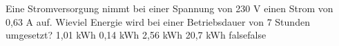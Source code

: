     {Eine Stromversorgung nimmt bei einer Spannung von 230 V einen Strom von 0,63 A auf. Wieviel Energie wird bei einer Betriebsdauer von 7 Stunden umgesetzt?}
    {1,01 kWh}
    {0,14 kWh}
    {2,56 kWh}
    {20,7 kWh}
    {false}{false}